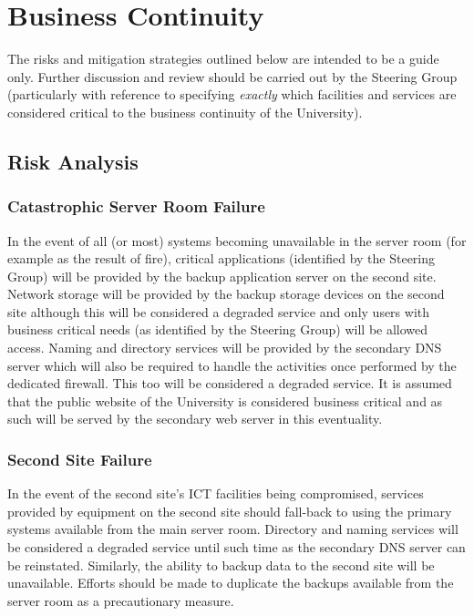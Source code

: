 \documentclass[a4paper, twoside]{article}
\begin{document}
\section{Business Continuity}
The risks and mitigation strategies outlined below are intended to be a guide
only. Further discussion and review should be carried out by the Steering Group
(particularly with reference to specifying \emph{exactly} which facilities and
services are considered critical to the business continuity of the University).

\subsection{Risk Analysis}
\subsubsection{Catastrophic Server Room Failure}
In the event of all (or most) systems becoming unavailable in the server room
(for example as the result of fire), critical applications (identified by the
Steering Group) will be provided by the backup application server on the second
site. Network storage will be provided by the backup storage devices on the
second site although this will be considered a degraded service and only users
with business critical needs (as identified by the Steering Group) will be
allowed access. Naming and directory services will be provided by the secondary
DNS server which will also be required to handle the activities once performed
by the dedicated firewall. This too will be considered a degraded service. It is
assumed that the public website of the University is considered business
critical and as such will be served by the secondary web server in this
eventuality.

\subsubsection{Second Site Failure}
In the event of the second site's ICT facilities being compromised, services
provided by equipment on the second site should fall-back to using the primary
systems available from the main server room. Directory and naming services will
be considered a degraded service until such time as the secondary DNS server can
be reinstated. Similarly, the ability to backup data to the second site will be
unavailable. Efforts should be made to duplicate the backups available from the
server room as a precautionary measure.
\end{document}
